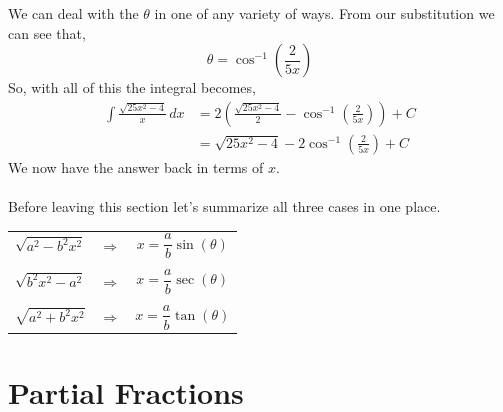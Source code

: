 \documentclass[10pt,reqno]{book}
\theoremstyle{definition}
\begin{document}
	We can deal with the $ \theta $ in one of any variety of ways. From our substitution we can see that,
	\[ \theta = \cos^{-1}\left(\frac{2}{5x}\right) \]
	So, with all of this the integral becomes,
	\begin{align*}
		\int \frac{\sqrt{25x^2 - 4}}{x}\,dx &= 2\left( \frac{\sqrt{25x^2-4}}{2} - \cos^{-1}\left(\frac{2}{5x}\right) \right) + C\\
		&=  \sqrt{25x^2-4} - 2\cos^{-1}\left(\frac{2}{5x}\right) + C
	\end{align*}
	We now have the answer back in terms of $ x $.\\ \\
	Before leaving this section let's summarize all three cases in one place.
	\begin{center}
		\begin{tabular}{ccc}
			$ \sqrt{a^2-b^2x^2} $ & $ \Rightarrow $ & $ x = \dfrac{a}{b}\sin(\theta) $ \\ \\
			$ \sqrt{b^2x^2-a^2} $ & $ \Rightarrow $ & $ x = \dfrac{a}{b}\sec(\theta) $ \\ \\ 
			$ \sqrt{a^2+b^2x^2} $ & $ \Rightarrow $ & $ x = \dfrac{a}{b}\tan(\theta) $ \\
		\end{tabular}	
	\end{center}

	\section{Partial Fractions}
	
\end{document}

